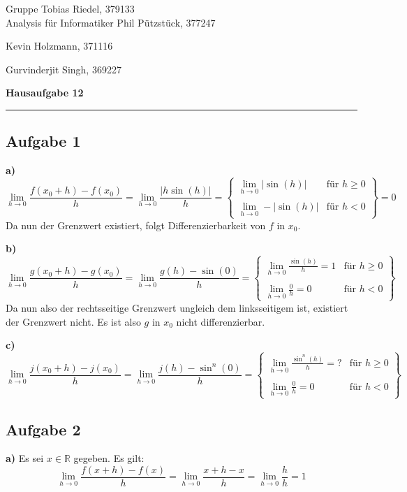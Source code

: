 \documentclass[a4paper,graphics,11pt]{article}
\newcommand{\aufgabe}[1]{\subsection*{Aufgabe #1}}
\begin{document}
\noindent Gruppe              \hfill Tobias Riedel, 379133 \\
\noindent Analysis für Informatiker             \hfill Phil Pützstück, 377247 \\
\strut\hfill Kevin Holzmann, 371116\\
\strut\hfill Gurvinderjit Singh, 369227
\begin{center}
	\LARGE{\textbf{Hausaufgabe 12}}
\end{center}
\begin{center}
\rule[0.1ex]{\textwidth}{1pt}
\end{center}



\aufgabe{1}
\textbf{a)}
$$
    \lim_{h \to 0} \frac{f(x_0+h)-f(x_0)}{h}
    = \lim_{h \to 0} \frac{|h\sin(h)|}{h}
    = \left\{\begin{array}{lr}
        \lim_{h \to 0}\limits |\sin(h)| & \text{für } h \geq 0\\
        \\
        \lim_{h \to 0}\limits -|\sin(h)| & \text{für } h < 0
    \end{array}\right\} = 0
$$
Da nun der Grenzwert existiert, folgt Differenzierbarkeit von $f$ in $x_0$.

\textbf{b)}
$$
    \lim_{h \to 0} \frac{g(x_0+h)-g(x_0)}{h}
    = \lim_{h \to 0} \frac{g(h)-\sin(0)}{h}
    = \left\{\begin{array}{lr}
        \lim_{h \to 0}\limits \frac{\sin(h)}{h} = 1& \text{für } h \geq 0\\
        \\
        \lim_{h \to 0}\limits \frac{0}{h} = 0 & \text{für } h < 0
    \end{array}\right\}
$$
Da nun also der rechtsseitige Grenzwert ungleich dem linksseitigem ist, existiert der Grenzwert nicht.
Es ist also $g$ in $x_0$ nicht differenzierbar.

\textbf{c)}
$$
    \lim_{h \to 0} \frac{j(x_0+h)-j(x_0)}{h}
    = \lim_{h \to 0} \frac{j(h)-\sin^n(0)}{h}
    = \left\{\begin{array}{lr}
        \lim_{h \to 0}\limits \frac{\sin^n(h)}{h} = ?& \text{für } h \geq 0\\
        \\
        \lim_{h \to 0}\limits \frac{0}{h} = 0 & \text{für } h < 0
    \end{array}\right\}
$$


\aufgabe{2}
\textbf{a)}
Es sei $x \in \mathbb{R}$ gegeben. Es gilt:
$$
    \lim_{h \to 0} \frac{f(x+h)-f(x)}{h}
    = \lim_{h \to 0} \frac{x+h-x}{h}
    = \lim_{h \to 0} \frac{h}{h} = 1
$$
\end{document}
